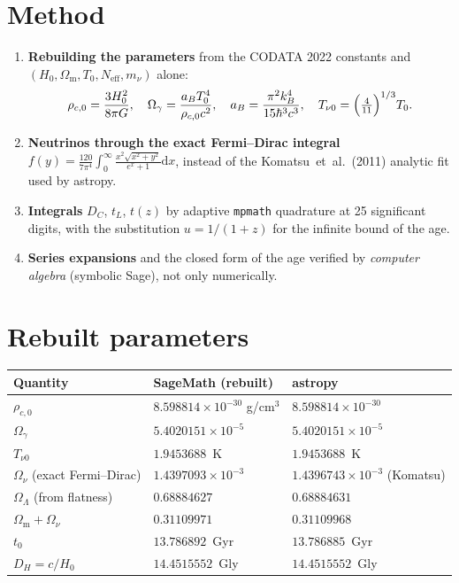 \documentclass[11pt,a4paper,openany]{report}
\newcommand{\Hzero}{H_{0}}
\newcommand{\Om}{\Omega_{\mathrm{m}}}
\newcommand{\OL}{\Omega_{\Lambda}}
\newcommand{\dif}{\mathrm{d}}
\begin{document}
\section{Method}

\begin{enumerate}[topsep=3pt]
\item \textbf{Rebuilding the parameters} from the CODATA 2022 constants and
$(\Hzero, \Om, T_{0}, N_{\text{eff}}, m_{\nu})$ alone:
\[
\rho_{c,0} = \frac{3\Hzero^{2}}{8\pi G},\quad
\Omega_{\gamma} = \frac{a_{B}T_{0}^{4}}{\rho_{c,0}c^{2}},\quad
a_{B} = \frac{\pi^{2}k_{B}^{4}}{15\hbar^{3}c^{3}},\quad
T_{\nu 0} = \Bigl(\tfrac{4}{11}\Bigr)^{1/3}T_{0}.
\]
\item \textbf{Neutrinos through the exact Fermi--Dirac integral}
$f(y) = \frac{120}{7\pi^{4}}\int_{0}^{\infty}\frac{x^{2}\sqrt{x^{2}+y^{2}}}{e^{x}+1}\dif x$,
instead of the Komatsu~et~al.~(2011) analytic fit used by astropy.
\item \textbf{Integrals} $D_{C}$, $t_{L}$, $t(z)$ by adaptive \texttt{mpmath}
quadrature at 25 significant digits, with the substitution $u = 1/(1+z)$ for
the infinite bound of the age.
\item \textbf{Series expansions} and the closed form of the age verified by
\emph{computer algebra} (symbolic Sage), not only numerically.
\end{enumerate}

\section{Rebuilt parameters}

\begin{center}
\renewcommand{\arraystretch}{1.25}
\begin{tabular}{lll}
\toprule
\textbf{Quantity} & \textbf{SageMath (rebuilt)} & \textbf{astropy} \\
\midrule
$\rho_{c,0}$ & $8.598814\times10^{-30}$ g/cm$^{3}$ & $8.598814\times10^{-30}$ \\
$\Omega_{\gamma}$ & $5.4020151\times10^{-5}$ & $5.4020151\times10^{-5}$ \\
$T_{\nu 0}$ & $1.9453688$~K & $1.9453688$~K \\
$\Omega_{\nu}$ (exact Fermi--Dirac) & $1.4397093\times10^{-3}$ &
   $1.4396743\times10^{-3}$ (Komatsu) \\
$\OL$ (from flatness) & $0.68884627$ & $0.68884631$ \\
$\Om + \Omega_{\nu}$ & $0.31109971$ & $0.31109968$ \\
$t_{0}$ & $13.786892$~Gyr & $13.786885$~Gyr \\
$D_{H} = c/\Hzero$ & $14.4515552$~Gly & $14.4515552$~Gly \\
\bottomrule
\end{tabular}
\end{center}
\end{document}
